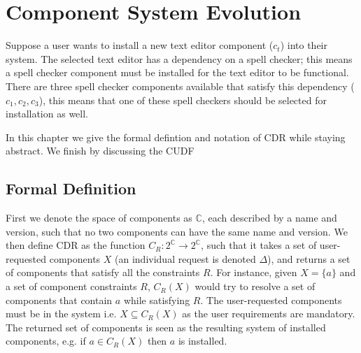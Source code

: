 \chapter{Component System Evolution}
\label{cdr}

Suppose a user wants to install a new text editor component ($c_t$) into their system.
The selected text editor has a dependency on a spell checker;
this means a spell checker component must be installed for the text editor to be functional.
There are three spell checker components available that satisfy this dependency ($c_1, c_2, c_3$),
this means that one of these spell checkers should be selected for installation as well.




In this chapter we give the formal defintion and notation of CDR while staying abstract. We finish by discussing the CUDF 
 
\section{Formal Definition}
First we denote the space of components as $\mathbb{C}$, each described by a name and version, such that no two components can have the same name and version.
We then define CDR as the function $C_R: 2^\mathbb{C} \rightarrow 2^\mathbb{C}$, 
such that it takes a set of user-requested components $X$ (an individual request is denoted $\Delta$),
and returns a set of components that satisfy all the constraints $R$.
For instance, given $X = \{a\}$ and a set of component constraints $R$,
$C_R(X)$ would try to resolve a set of components that contain $a$ while satisfying $R$.
The user-requested components must be in the system i.e. $X \subseteq C_R(X)$ as the user requirements are mandatory.
The returned set of components is seen as the resulting system of installed components, e.g. if $a \in C_R(X)$ then $a$ is installed.


